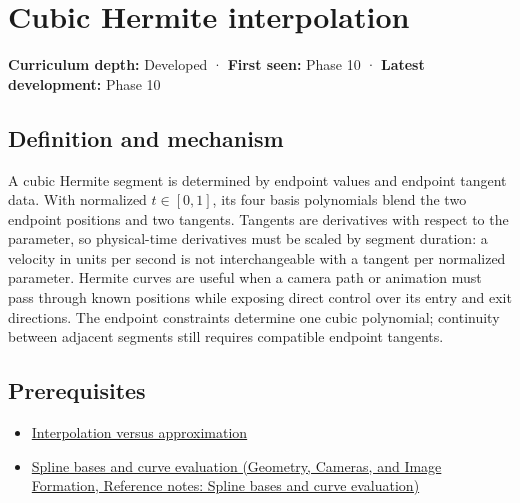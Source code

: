 \hypertarget{appendix-db3aef8f2fd6}{}\label{referencestart:appendix-db3aef8f2fd6}
\section{Cubic Hermite interpolation}\label{appendix-db3aef8f2fd6-cubic-hermite-interpolation}

\hypertarget{appendix-db3aef8f2fd6-cubic-hermite-interpolation}{}

\textbf{Curriculum depth:} Developed · \textbf{First seen:} Phase 10 · \textbf{Latest development:} Phase 10

\begin{allmightroledefinition}

\subsection{Definition and mechanism}\label{appendix-db3aef8f2fd6-definition-and-mechanism}

\hypertarget{appendix-db3aef8f2fd6-definition-and-mechanism}{}

A cubic Hermite segment is determined by endpoint values and endpoint tangent data. With normalized \(t\in[0,1]\), its four basis polynomials blend the two endpoint positions and two tangents. Tangents are derivatives with respect to the parameter, so physical-time derivatives must be scaled by segment duration: a velocity in units per second is not interchangeable with a tangent per normalized parameter. Hermite curves are useful when a camera path or animation must pass through known positions while exposing direct control over its entry and exit directions. The endpoint constraints determine one cubic polynomial; continuity between adjacent segments still requires compatible endpoint tangents.

\end{allmightroledefinition}

\subsection{Prerequisites}\label{appendix-db3aef8f2fd6-prerequisites}

\hypertarget{appendix-db3aef8f2fd6-prerequisites}{}

\begin{itemize}
\tightlist
\item
  \hyperref[appendix-0c2a5f69851e]{Interpolation versus approximation}
\item
  \href{../03-Geometry-Cameras-and-Image-Formation/main.pdf\#nameddest=appendix-f28eeec97a3d}{Spline bases and curve evaluation (Geometry, Cameras, and Image Formation, Reference notes: Spline bases and curve evaluation)}
\end{itemize}

